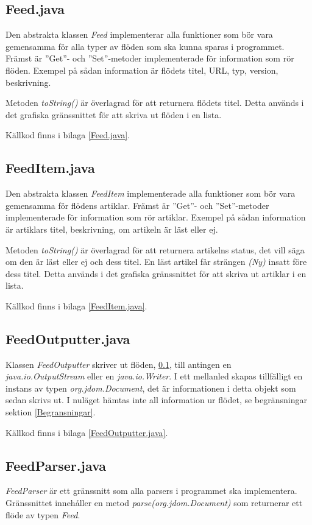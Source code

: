 \documentclass[a4paper, 12pt]{article}
\begin{document}
\subsection{Feed.java}\label{Feed}
Den abstrakta klassen \textit{Feed} implementerar alla funktioner som
bör vara gemensamma för alla typer av flöden som ska kunna sparas i
programmet. Främst är ''Get''- och ''Set''-metoder implementerade för
information som rör flöden. Exempel på sådan information är flödets
titel, URL, typ, version, beskrivning.

Metoden \textit{toString()} är överlagrad för att returnera flödets
titel. Detta används i det grafiska gränssnittet för att skriva ut
flöden i en lista.

Källkod finns i bilaga \ref{Feed.java}.

\subsection{FeedItem.java}\label{FeedItem}
Den abstrakta klassen \textit{FeedItem} implementerade alla funktioner
som bör vara gemensamma för flödens artiklar. Främst är ''Get''- och
''Set''-metoder implementerade för information som rör
artiklar. Exempel på sådan information är artiklars titel,
beskrivning, om artikeln är läst eller ej.

Metoden \textit{toString()} är överlagrad för att returnera artikelns
status, det vill säga om den är läst eller ej och dess titel. En läst
artikel får strängen \textit{(Ny)} insatt före dess titel. Detta
används i det grafiska gränssnittet för att skriva ut artiklar i en
lista.

Källkod finns i bilaga \ref{FeedItem.java}.

\subsection{FeedOutputter.java}\label{FeedOutputter}
Klassen \textit{FeedOutputter} skriver ut flöden, \ref{Feed}, till
antingen en \textit{java.io.OutputStream} eller en
\textit{java.io.Writer}. I ett mellanled skapas tillfälligt en instans
av typen \textit{org.jdom.Document}, det är informationen i detta
objekt som sedan skrivs ut. I nuläget hämtas inte all information ur
flödet, se begränsningar sektion \ref{Begransningar}.

Källkod finns i bilaga \ref{FeedOutputter.java}.

\subsection{FeedParser.java}\label{FeedParser}
\textit{FeedParser} är ett gränssnitt som alla parsers i programmet
ska implementera. Gränssnittet innehåller en metod
\textit{parse(org.jdom.Document)} som returnerar ett flöde av typen
\textit{Feed}.
\end{document}
